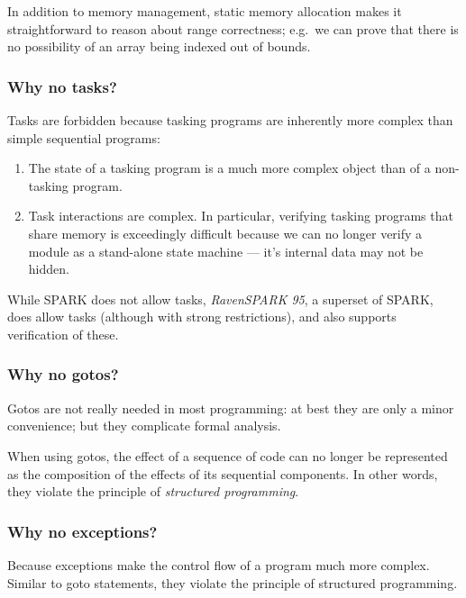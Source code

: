 In addition to memory management, static memory allocation makes it straightforward to reason about range correctness; e.g.\ we can prove that there is no possibility of an array being indexed out of bounds.

\subsubsection*{Why no tasks?}

Tasks are forbidden because tasking programs are inherently more complex than simple sequential programs:

\begin{enumerate}

 \item The state of a tasking program is a much more complex object than of a non-tasking program.

 \item Task interactions are complex. In particular, verifying tasking programs that share memory is exceedingly difficult because we can no longer verify a module as a stand-alone state machine --- it's internal data may not be hidden.

\end{enumerate}

While SPARK does not allow tasks, \emph{RavenSPARK 95}, a superset of SPARK, does allow tasks (although with strong restrictions), and also supports verification of these.

\subsubsection*{Why no gotos?}

Gotos are not really needed in most programming: at best they are only a minor convenience; but they complicate formal analysis.


When using gotos, the effect of a sequence of code can no longer be represented as the composition of the effects of its sequential components. In other words, they violate the principle of \emph{structured programming}.
 

\subsubsection*{Why no exceptions?}

Because exceptions make the control flow of a program much more complex. Similar to goto statements, they violate the principle of structured programming.

